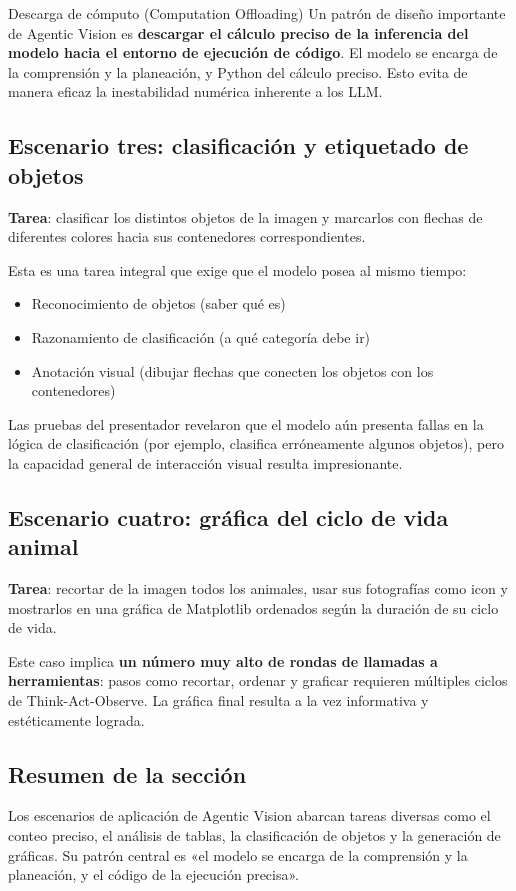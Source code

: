 \begin{importantbox}{Descarga de cómputo (Computation Offloading)}
Un patrón de diseño importante de Agentic Vision es \textbf{descargar el cálculo preciso de la inferencia del modelo hacia el entorno de ejecución de código}. El modelo se encarga de la comprensión y la planeación, y Python del cálculo preciso. Esto evita de manera eficaz la inestabilidad numérica inherente a los LLM.
\end{importantbox}

\subsection{Escenario tres: clasificación y etiquetado de objetos}

\textbf{Tarea}: clasificar los distintos objetos de la imagen y marcarlos con flechas de diferentes colores hacia sus contenedores correspondientes.

Esta es una tarea integral que exige que el modelo posea al mismo tiempo:
\begin{itemize}
    \item Reconocimiento de objetos (saber qué es)
    \item Razonamiento de clasificación (a qué categoría debe ir)
    \item Anotación visual (dibujar flechas que conecten los objetos con los contenedores)
\end{itemize}

Las pruebas del presentador revelaron que el modelo aún presenta fallas en la lógica de clasificación (por ejemplo, clasifica erróneamente algunos objetos), pero la capacidad general de interacción visual resulta impresionante.

\subsection{Escenario cuatro: gráfica del ciclo de vida animal}

\textbf{Tarea}: recortar de la imagen todos los animales, usar sus fotografías como icon y mostrarlos en una gráfica de Matplotlib ordenados según la duración de su ciclo de vida.

Este caso implica \textbf{un número muy alto de rondas de llamadas a herramientas}: pasos como recortar, ordenar y graficar requieren múltiples ciclos de Think-Act-Observe. La gráfica final resulta a la vez informativa y estéticamente lograda.

\subsection{Resumen de la sección}

Los escenarios de aplicación de Agentic Vision abarcan tareas diversas como el conteo preciso, el análisis de tablas, la clasificación de objetos y la generación de gráficas. Su patrón central es «el modelo se encarga de la comprensión y la planeación, y el código de la ejecución precisa».

